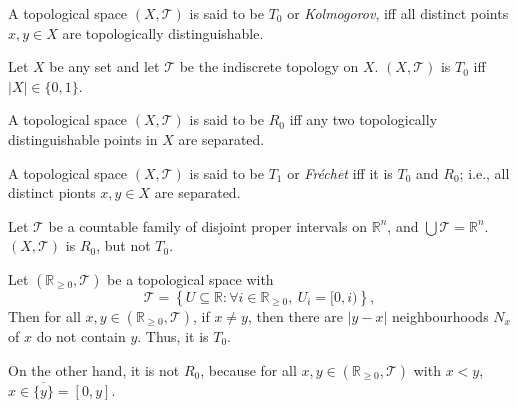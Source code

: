
\begin{definition}
	[$T_0$ spaces]
	\label{def: T_1 spaces}
	A topological space $(X, \mathcal T)$ is said to be $T_0$ or \textit{Kolmogorov}, iff all distinct points $x,y \in X$ are topologically distinguishable.
\end{definition}


\begin{example}
	Let $X$ be any set and let $\mathcal T$ be the indiscrete topology on $X$. $(X, \mathcal T)$ is $T_0$ iff $|X| \in \{0, 1\}$.
\end{example}




\begin{definition}
	[$R_0$ spaces]
	\label{def: R_0 spaces}
	A topological space $(X, \mathcal T)$ is said to be $R_0$ iff any two topologically distinguishable points in $X$ are separated.
\end{definition}


\begin{definition}
	[$T_1$ Spaces]
	\label{def: T_1 spaces}
	A topological space $(X, \mathcal T)$ is said to be $T_1$ or \textit{Fr\'echet} iff it is $T_0$ and $R_0$; i.e., all distinct pionts $x,y \in X$ are separated.
\end{definition}

\begin{example}
	Let $\mathcal T$ be a countable family of disjoint proper intervals on $\mathbb R^n$, and $\bigcup \mathcal T = \mathbb R^n$. $(X, \mathcal T)$ is $R_0$, but not $T_0$.
\end{example}


\begin{example}
	\label{eg: T_0 but not T_1}
	Let $(\mathbb R_{\ge 0}, \mathcal T)$ be a topological space with
	$$
	\mathcal T = \left\{ U \subseteq \mathbb R : \forall i \in \mathbb R_{\ge 0}, \ U_i = [0, i)  \right\},
	$$
	Then for all $x,y \in (\mathbb R_{\ge 0}, \mathcal T)$, if $x \ne y$, then there are $|y - x|$ neighbourhoods $N_x$ of $x$ do not contain $y$. Thus, it is $T_0$.
	
	On the other hand, it is not $R_0$, because for all $x, y \in (\mathbb R_{\ge 0}, \mathcal T)$ with $x < y$, $x \in \overline{\{y\}} = [0, y]$.
\end{example}


